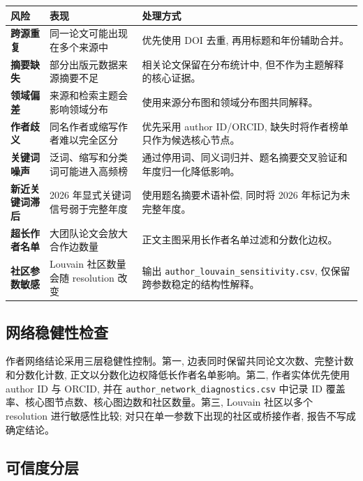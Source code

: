 \begin{tableblock}
\begin{tabularx}{\textwidth}{>{\bfseries}p{30mm}X X}
\toprule
风险 & 表现 & 处理方式 \\
\midrule
跨源重复 & 同一论文可能出现在多个来源中 & 优先使用 DOI 去重, 再用标题和年份辅助合并。 \\
摘要缺失 & 部分出版元数据来源摘要不足 & 相关论文保留在分布统计中, 但不作为主题解释的核心证据。 \\
领域偏差 & 来源和检索主题会影响领域分布 & 使用来源分布图和领域分布图共同解释。 \\
作者歧义 & 同名作者或缩写作者难以完全区分 & 优先采用 author ID/ORCID, 缺失时将作者榜单只作为候选核心节点。 \\
关键词噪声 & 泛词、缩写和分类词可能进入高频榜 & 通过停用词、同义词归并、题名摘要交叉验证和年度归一化降低影响。 \\
新近关键词滞后 & 2026 年显式关键词信号弱于完整年度 & 使用题名摘要术语补偿, 同时将 2026 年标记为未完整年度。 \\
超长作者名单 & 大团队论文会放大合作边数量 & 正文主图采用长作者名单过滤和分数化边权。 \\
社区参数敏感 & Louvain 社区数量会随 resolution 改变 & 输出 \texttt{author\_louvain\_sensitivity.csv}, 仅保留跨参数稳定的结构性解释。 \\
\bottomrule
\end{tabularx}
\end{tableblock}

\subsection{网络稳健性检查}

作者网络结论采用三层稳健性控制。第一, 边表同时保留共同论文次数、完整计数和分数化计数, 正文以分数化边权降低长作者名单影响。第二, 作者实体优先使用 author ID 与 ORCID, 并在 \texttt{author\_network\_diagnostics.csv} 中记录 ID 覆盖率、核心图节点数、核心图边数和社区数量。第三, Louvain 社区以多个 resolution 进行敏感性比较; 对只在单一参数下出现的社区或桥接作者, 报告不写成确定结论。

\subsection{可信度分层}

